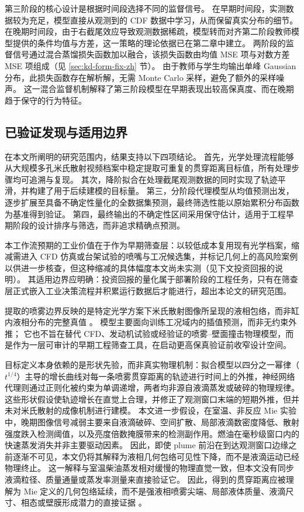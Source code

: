 第三阶段的核心设计是根据时间段选择不同的监督信号。
在早期时间段，实测数据较为充足，模型直接从观测到的 CDF 数据中学习，从而保留真实分布的细节。
在晚期时间段，由于右截尾效应导致观测数据稀疏，模型转而对齐第二阶段教师模型提供的条件均值与方差，这一策略的理论依据已在第二章中建立。
两阶段的监督信号通过混合蒸馏损失函数加以融合，该损失函数由均值 MSE 项与对数方差 MSE 项组成（见 \ref{sec:kd-form-fix-zh} 节）。
由于教师与学生均输出单峰 Gaussian 分布，此损失函数存在解析解，无需 Monte Carlo 采样，避免了额外的采样噪声。
这一混合监督机制解释了第三阶段模型在早期表现出较高保真度、而在晚期趋于保守的行为特征。

\subsection{已验证发现与适用边界}

在本文所阐明的研究范围内，结果支持以下四项结论。
首先，光学处理流程能够从大规模多孔米氏散射视频档案中稳定提取可重复的贯穿距离目标值，所有处理步骤均可追溯与复现。
其次，降阶拟合在处理截尾观测数据的同时实现了轨迹平滑，并构建了用于后续建模的目标量。
第三，分阶段代理模型从均值预测出发，逐步扩展至具备不确定性量化的全数据集预测，最终筛选性能以原始累积分布函数为基准得到验证。
第四，最终输出的不确定性区间采用保守估计，适用于工程早期阶段的设计排序与筛选，而非追求精确点预测。

本工作流预期的工业价值在于作为早期筛查层：以较低成本复用现有光学档案，缩减需进入 CFD 仿真或台架试验的喷嘴与工况候选集，并标记几何上的高风险案例以供进一步核查，但这种缩减的具体幅度本文尚未实测（见下文投资回报的说明）。
其适用边界应明确：投资回报的量化属于部署阶段的工程任务，只有在筛查层正式嵌入工业决策流程并积累运行数据后才能进行，超出本论文的研究范围。

提取的喷雾边界反映的是特定光学方案下米氏散射图像所呈现的液相包络，而非缸内液相分布的完整真值 \cite{ecn_liquid_penetration,ecn_liquid_penetration_accessory}。
模型主要面向训练工况域内的插值预测，而非无约束外推；
它也不旨在替代 CFD、发动机试验或经验证的喷雾--壁面撞击物理模型，而是作为一层可审计的早期工程筛查工具，在启动更高保真验证前收窄设计空间。

目标定义本身依赖的是形状先验，而非真实物理机制：拟合模型以四分之一幂律（$t^{1/4}$）主导的增长曲线对每一条喷雾贯穿距离的轨迹进行时间上的外推，神经网络代理则通过正则化被约束为单调递增，两者均非源自液滴蒸发或破碎的物理规律。
这些形状假设使轨迹增长在直觉上合理，并修正了观测窗口末端的短期外推，但并未对米氏散射的成像机制进行建模。
本文进一步假设，在室温、非反应 Mie 实验中，晚期图像信号减弱主要来自液滴破碎、空间扩散、局部液滴数密度降低、散射强度跌入检测阈值，以及亮度倍数掩膜带来的检测副作用。燃油在毫秒级窗口内的快速蒸发消失并非主要驱动因素。
因此，即使 plume 前沿在到达观测窗口边缘之前逐渐不可见，本文仍将其解释为液相几何包络可见性下降，而不是液滴运动已经物理终止。
这一解释与室温柴油蒸发相对缓慢的物理直觉一致，但本文没有同步液滴粒径、质量通量或蒸发率测量来直接验证它。
因此，得到的贯穿距离应被理解为 Mie 定义的几何包络延续，而不是强液相喷雾尖端、局部液体质量、液滴尺寸、相态或壁膜形成潜力的直接证据 \cite{ecn_liquid_penetration,ecn_liquid_penetration_accessory}。

